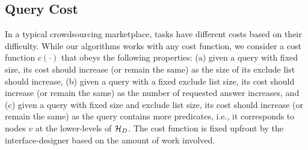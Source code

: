 \subsection{Query Cost} 
In a typical crowdsourcing marketplace, tasks have different costs based on their difficulty. While our algorithms works with any cost function, we consider a cost function $c(\cdot)$ that obeys the following properties:  (a) given a query with fixed size, its cost should increase (or remain the same) as the size of its exclude list should increase, (b) given a query with a fixed exclude list size, its cost should increase (or remain the same) as the number of requested answer increases, and (c) given a query with fixed size and exclude list size, its cost should increase (or remain the same) as the query contains more predicates, i.e., it corresponds to nodes $v$ at the lower-levels of $\mathcal{H}_D$. The cost function is fixed upfront by the interface-designer based on the amount of work involved.

